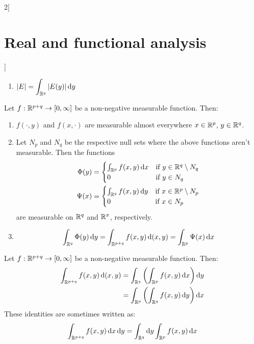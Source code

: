 \documentclass[../../../main_math.tex]{subfiles}
\begin{document}
\begin{multicols}{2}[\section{Real and functional analysis}]
\begin{lemma}
\begin{enumerate}
      \item $\displaystyle\m{E}=\int_{\RR^q}\m{E(y)}\dd{y}$
    \end{enumerate}
  \end{lemma}
  \begin{theorem}
    Let $f:\mathbb{R}^{p+q}\rightarrow[0,\infty]$ be a non-negative measurable function. Then:
    \begin{enumerate}
      \item $f(\cdot,y)$ and $f(x,\cdot)$ are measurable almost everywhere $x\in\mathbb{R}^p$, $y\in\mathbb{R}^q$.
      \item Let $N_p$ and $N_q$ be the respective null sets where the above functions aren't measurable. Then the functions
            \begin{align*}
              \Phi(y) & =\begin{cases}
                           \int_{\mathbb{R}^p}f(x,y)\dd{x} & \text{if } y\in\mathbb{R}^q\setminus N_q \\
                           0                        & \text{if } y\in N_q
                         \end{cases} \\ \Psi(x)&=\begin{cases}
                \int_{\mathbb{R}^q}f(x,y)\dd{y} & \text{if } x\in\mathbb{R}^p\setminus N_p \\
                0                        & \text{if } x\in N_p
              \end{cases}
            \end{align*}
            are measurable on $\mathbb{R}^q$ and $\mathbb{R}^x$, respectively.
      \item \hfill $$\int_{\mathbb{R}^q}\Phi(y)\dd{y}=\int_{\mathbb{R}^{p+q}}f(x,y)\dd{(x,y)}=\int_{\mathbb{R}^p}\Psi(x)\dd{x}$$
    \end{enumerate}
  \end{theorem}
  \begin{corollary}
    Let $f:\mathbb{R}^{p+q}\rightarrow[0,\infty]$ be a non-negative measurable function. Then:
    \begin{align*}
      \int_{\mathbb{R}^{p+q}}f(x,y)\dd{(x,y)} & =\int_{\mathbb{R}^q}\left(\int_{\mathbb{R}^p}f(x,y)\dd{x}\right)\dd{y} \\
                                       & =\int_{\mathbb{R}^p}\left(\int_{\mathbb{R}^q}f(x,y)\dd{y}\right)\dd{x}
    \end{align*}
    These identities are sometimes written as:
    \begin{align*}
      \int_{\RR^{p+q}}f(x,y)\dd{x}\dd{y} & =\int_{\RR^q}\dd{y}\int_{\RR^p}f(x,y)\dd{x} \\

\end{align*}
\end{corollary}
\end{multicols}
\end{document}
